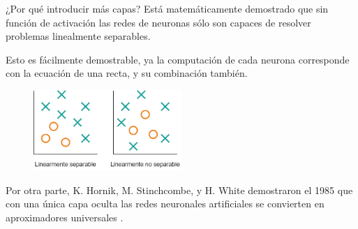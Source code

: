 \begin{frame}{¿Por qué introducir más capas?}
Está matemáticamente \alert{demostrado} que sin función de activación las redes de neuronas sólo son capaces de resolver problemas \alert{linealmente separables}.

Esto es fácilmente demostrable, ya la computación de cada neurona corresponde con la ecuación de \alert{una recta}, y su combinación también.

\begin{figure}
\centering
    \includegraphics[width=0.5\textwidth]{figures/Tema 1/Separabilidad_Lineal.png}
\end{figure}

Por otra parte, K. Hornik, M. Stinchcombe, y H. White demostraron el 1985 que con \alert{una única capa oculta} las redes neuronales artificiales se convierten en aproximadores universales \cite{hornik1989multilayer}.
\end{frame}



